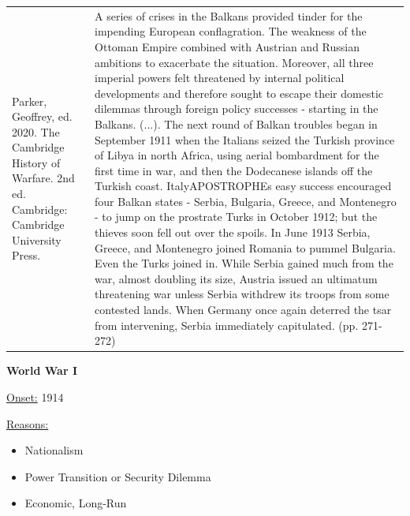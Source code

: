 {\begin{longtable}{p{}p{}}
\\
Parker, Geoffrey, ed. 2020. The Cambridge History of Warfare. 2nd ed. Cambridge: Cambridge University Press. & A series of crises in the Balkans provided tinder for the impending European conflagration. The weakness of the Ottoman Empire combined with Austrian and Russian ambitions to exacerbate the situation. Moreover, all three imperial powers felt threatened by internal political developments and therefore sought to escape their domestic dilemmas through foreign policy successes - starting in the Balkans. (...). 
The next round of Balkan troubles began in September 1911 when the Italians seized the Turkish province of Libya in north Africa, using aerial bombardment for the first time in war, and then the Dodecanese islands off the Turkish coast. ItalyAPOSTROPHEs easy success encouraged four Balkan states - Serbia, Bulgaria, Greece, and Montenegro - to jump on the prostrate Turks in October 1912; but the thieves soon fell out over the spoils. In June 1913 Serbia, Greece, and Montenegro joined Romania to pummel Bulgaria. Even the Turks joined in. While Serbia gained much from the war, almost doubling its size, Austria issued an ultimatum threatening war unless Serbia withdrew its troops from some contested lands. When Germany once again deterred the tsar from intervening, Serbia immediately capitulated. (pp. 271-272)
\\
\end{longtable}}
\clearpage
         \textbf{World War I} 

          \underline{Onset:} 1914         

\underline{Reasons:}
\begin{itemize}
\item Nationalism
\item Power Transition or Security Dilemma
\item Economic, Long-Run
\end{itemize}

